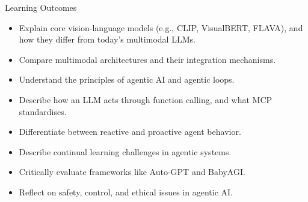\begin{frame}{Learning Outcomes}
  \begin{itemize}
    \item Explain core vision-language models (e.g., CLIP, VisualBERT, FLAVA), and how they differ from
      today's multimodal LLMs.
    \item Compare multimodal architectures and their integration mechanisms.
    \item Understand the principles of agentic AI and agentic loops.
    \item Describe how an LLM acts through function calling, and what MCP standardises.
    \item Differentiate between reactive and proactive agent behavior.
    \item Describe continual learning challenges in agentic systems.
    \item Critically evaluate frameworks like Auto-GPT and BabyAGI.
    \item Reflect on safety, control, and ethical issues in agentic AI.
  \end{itemize}
\end{frame}
